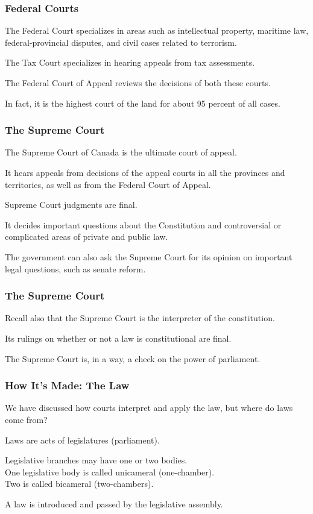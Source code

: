 \begin{frame}
\frametitle{Federal Courts}

The Federal Court specializes in areas such as intellectual property, maritime law, federal-provincial disputes, and civil cases related to terrorism.

The Tax Court specializes in hearing appeals from tax assessments.

The Federal Court of Appeal reviews the decisions of both these courts. 

In fact, it is the highest court of the land for about 95 percent of all cases.

\end{frame}

\begin{frame}
\frametitle{The Supreme Court}

The Supreme Court of Canada is the ultimate court of appeal. 

It hears appeals from decisions of the appeal courts in all the provinces and territories, as well as from the Federal Court of Appeal. 

Supreme Court judgments are final.

It decides important questions about the Constitution and controversial or complicated areas of private and public law. 

The government can also ask the Supreme Court for its opinion on important legal questions, such as senate reform.


\end{frame}



\begin{frame}
\frametitle{The Supreme Court}

Recall also that the Supreme Court is the interpreter of the constitution.

Its rulings on whether or not a law is constitutional are final.

The Supreme Court is, in a way, a check on the power of parliament.

\end{frame}



\begin{frame}
\frametitle{How It's Made: The Law}

We have discussed how courts interpret and apply the law, but where do laws come from?

Laws are acts of legislatures (parliament).

Legislative branches may have one or two bodies.\\
\quad One legislative body is called unicameral (one-chamber).\\
\quad Two is called bicameral (two-chambers).

A law is introduced and passed by the legislative assembly.

\end{frame}



